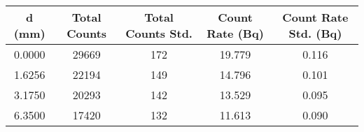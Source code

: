 \begin{tabular}{ccccc}
\toprule
 d (mm) &  Total Counts &  Total Counts Std. &  Count Rate (Bq) &  Count Rate Std. (Bq) \\
\midrule
 0.0000 &       29669 &         172 &        19.779 &              0.116 \\
 1.6256 &       22194 &         149 &        14.796 &              0.101 \\
 3.1750 &       20293 &         142 &        13.529 &              0.095 \\
 6.3500 &       17420 &         132 &        11.613 &              0.090 \\
\bottomrule
\end{tabular}
